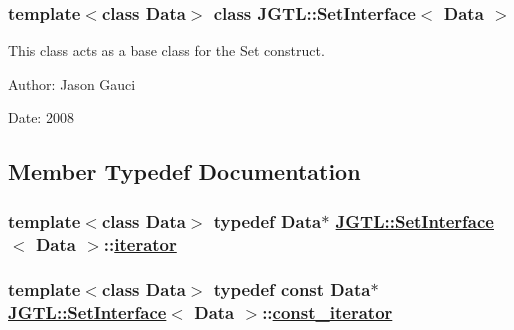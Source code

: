 \subsubsection*{template$<$class Data$>$ class JGTL::Set\-Interface$<$ Data $>$}

This class acts as a base class for the Set construct. 

\begin{Desc}
\item[Author:]Jason Gauci \end{Desc}
\begin{Desc}
\item[Date:]2008 \end{Desc}




\subsection{Member Typedef Documentation}
\hypertarget{class_j_g_t_l_1_1_set_interface_1f4b953e9a9adb5d463b6abb24623372}{
\subsubsection[iterator]{\setlength{\rightskip}{0pt plus 5cm}template$<$class Data$>$ typedef Data$\ast$ \hyperlink{class_j_g_t_l_1_1_set_interface}{JGTL::Set\-Interface}$<$ Data $>$::\hyperlink{class_j_g_t_l_1_1_set_interface_1f4b953e9a9adb5d463b6abb24623372}{iterator}}}
\label{class_j_g_t_l_1_1_set_interface_1f4b953e9a9adb5d463b6abb24623372}


\hypertarget{class_j_g_t_l_1_1_set_interface_1e545e77790db36de24904dc70054225}{
\subsubsection[const\_\-iterator]{\setlength{\rightskip}{0pt plus 5cm}template$<$class Data$>$ typedef const Data$\ast$ \hyperlink{class_j_g_t_l_1_1_set_interface}{JGTL::Set\-Interface}$<$ Data $>$::\hyperlink{class_j_g_t_l_1_1_set_interface_1e545e77790db36de24904dc70054225}{const\_\-iterator}}}
\label{class_j_g_t_l_1_1_set_interface_1e545e77790db36de24904dc70054225}




